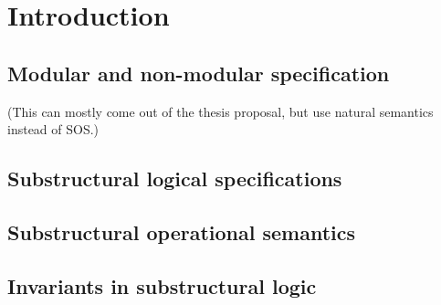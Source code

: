 \chapter{Introduction}

\section{Modular and non-modular specification}
\label{sec:modularnonmodular}

(This can mostly come out of the thesis proposal, but use 
natural semantics instead of SOS.)

\section{Substructural logical specifications}

\section{Substructural operational semantics}
\label{sec:intro-ssos}

\section{Invariants in substructural logic}
